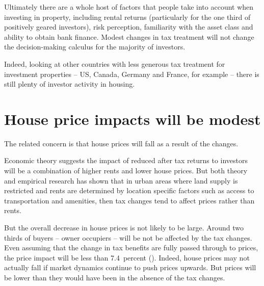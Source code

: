 \documentclass{grattan}\usepackage[]{graphicx}\usepackage[]{color}
\begin{document}
Ultimately there are a whole host of factors that people take into account when investing in property, including rental returns (particularly for the one third of positively geared investors), risk perception, familiarity with the asset class and ability to obtain bank finance.  Modest changes in tax treatment will not change the decision-making calculus for the majority of investors. 

Indeed, looking at other countries with less generous tax treatment for investment properties -- US, Canada, Germany and France, for example -- there is still plenty of investor activity in housing.

\section{House price impacts will be modest}
The related concern is that house prices will fall as a result of the changes. 

Economic theory suggests the impact of reduced after tax returns to investors will be a combination of higher rents and lower house prices.  But both theory and empirical research has shown that in urban areas where land supply is restricted and rents are determined by location specific factors such as access to transportation and amenities, then tax changes tend to affect prices rather than rents.  



But the overall decrease in house prices is not likely to be large. Around two thirds of buyers -- owner occupiers -- will be not be affected by the tax changes. Even assuming that the change in tax benefits are fully passed through to prices, the price impact will be less than 7.4~percent (). Indeed, house prices may not actually fall if market dynamics continue to push prices upwards. But prices will be lower than they would have been in the absence of the tax changes.
\end{document}
